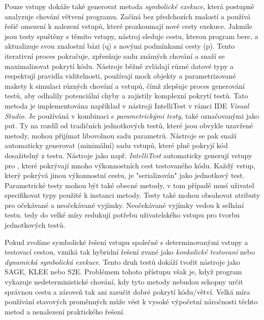 \documentclass[12pt]{article}
\begin{document}
            Pouze vstupy dokáže také generovat metoda \textit{symbolické exekuce}, která postupně analyzuje chování větvení programu. Začíná bez předchozích znalostí a používá řešič omezení k nalezení vstupů, které prozkoumají nové cesty exekuce. Jakmile jsou testy spuštěny s těmito vstupy, nástroj sleduje cestu, kterou program bere, a aktualizuje svou znalostní bázi (q) s novými podmínkami cesty (p). Tento iterativní proces pokračuje, zpřesňuje sadu známých chování a snaží se maximalizovat pokrytí kódu. Nástroje běžně zvládají různé datové typy a respektují pravidla viditelnosti, používají mock objekty a parametrizované makety k simulaci různých chování a vstupů, čímž zlepšuje proces generování testů, aby odhalily potenciální chyby a zajistily komplexní pokrytí testů. \cite{parizek_symbolic_execution} Tato metoda je implementována například v nástroji IntelliTest v rámci IDE \textit{Visual Studio}. Je používáná v kombinaci s \emph{parametrickými testy}, také označovanými jako \acrshort{put}. Ty na rozdíl od tradičních jednotkových testů, které jsou obvykle uzavřené metody, mohou přijímat libovolnou sadu parametrů. Nástroje se pak snaží automaticky generovat (minimální) sadu vstupů, které plně pokryjí kód dosažitelný z testu. Nástroje jako např. \textit{IntelliTest} automaticky generují vstupy pro , které pokrývají mnoho výkonnostních cest testovaného kódu. Každý vstup, který pokrývá jinou výkonnostní cestu, je "serializován" jako jednotkový test. Parametrické testy mohou být také obecné metody, v tom případě musí uživatel specifikovat typy použité k instanci metody. Testy také mohou obsahovat atributy pro očekávané a neočekávané vyjímky. Neočekávané vyjímky vedou k selhání testu.  tedy do velké míry redukují potřebu uživatelského vstupu pro tvorbu jednotkových testů. \cite{IntelliTestInputGeneration2023} \cite{microsoft2023testgen}

            Pokud zvolíme symbolické řešení vstupu společně s determinovanými vstupy a testovací cestou, vzniká tak hybridní řešení zvané jako \emph{konkolické testovaní} nebo \emph{dynamická symbolická exekuce}. Tento druh testů dokáží tvořit nástroje jako SAGE, KLEE nebo S2E. Problémem tohoto přístupu však je, když program vykazuje nedeterministické chování, kdy tyto metody nebudou schopny určit správnou cestu a zároveň tak ani zaručit dobré pokrytí kódu/větví. Velká míra používání stavových proměnných může vést k vysoké výpočetní náročnosti těchto metod a nenalezení praktického řešení. \cite{engler2006exe} \cite{sen2005cute} \cite{zhou2006safedrive}
\end{document}
